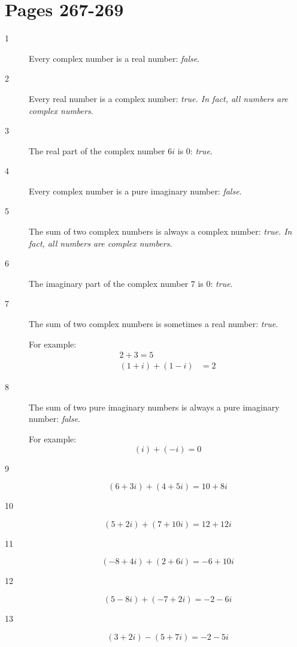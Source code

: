 \documentclass[fleqn,addpoints]{exam}
\begin{document}
\ifprintanswers

\section{Pages 267-269}
\begin{description}

\item[1]
Every complex number is a real number: {\em false}.

\item[2]
Every real number is a complex number: {\em true.  In fact, all numbers are complex numbers}.

\item[3]
The real part of the complex number $6i$ is $0$: {\em true}.

\item[4]
Every complex number is a pure imaginary number: {\em false}.

\item[5]
The sum of two complex numbers is always a complex number: {\em true.  In fact, all numbers are complex numbers.}

\item[6]
The imaginary part of the complex number $7$ is $0$: {\em true}.

\item[7]
The sum of two complex numbers is sometimes a real number: {\em true}.

For example:
\begin{align*}
  2 + 3 = 5 \\
  (1 + i) + (1 - i) &= 2
\end{align*}

\item[8]
The sum of two pure imaginary numbers is always a pure imaginary number: {\em false}.

For example:
\[
  (i) + (-i) = 0
\]

\item[9]
\[
  (6+3i) + (4+5i) = 10 + 8i
\]

\item[10]
\[
  (5+2i) + (7+10i) = 12 + 12i
\]

\item[11]
\[
  (-8+4i) + (2+6i) = -6+10i
\]

\item[12]
\[
  (5-8i) + (-7+2i) = -2 - 6i
\]

\item[13]
\[
  (3+2i) - (5+7i) = -2 - 5i
\]


\end{description}
\end{document}
